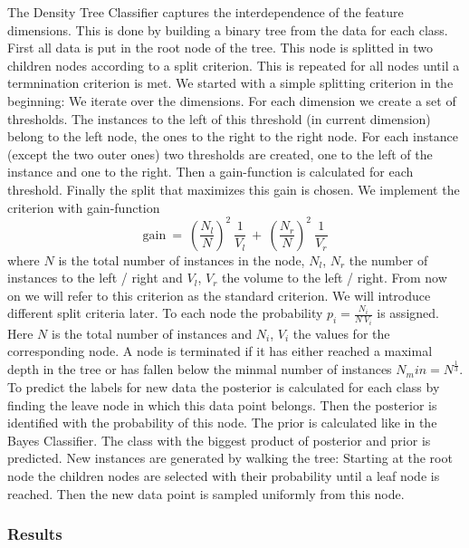 \documentclass{article}
\begin{document}
The Density Tree Classifier captures the interdependence of the feature dimensions. This is done by 
building a binary tree from the data for each class.
First all data is put in the root node of the tree. This node is splitted in two children nodes according to a split criterion.
This is repeated for all nodes until a termnination criterion is met.
\newline
We started with a simple splitting criterion in the beginning:
We iterate over the dimensions. For each dimension we create a set of thresholds. 
The instances to the left of this threshold (in current dimension) belong to the left node, the ones to 
the right to the right node. For each instance (except the two outer ones) two thresholds are created, one to the left
of the instance and one to the right.
Then a gain-function is calculated for each threshold. Finally the split that maximizes this gain is chosen.
We implement the criterion with gain-function
\begin{equation}
	\mathrm{gain} ~ = ~ ( \frac{N_l}{N} )^2 ~ \frac{1}{V_l} ~ +  ~ ( \frac{N_r}{N} )^2 ~ \frac{1}{V_r} 
\end{equation}
where $N$ is the total number of instances in the node, $N_l$, $N_r$ the number of instances to the left / right
and $V_l$, $V_r$ the volume to the left / right.
From now on we will refer to this criterion as the standard criterion. We will introduce different split 
criteria later.
\newline
To each node the probability $p_i = \frac{N_i}{N ~ V_i}$ is assigned. Here $N$ is the total number of instances
and $N_i$, $V_i$ the values for the corresponding node.
\newline
A node is terminated if it has either reached a maximal depth in the tree or has fallen below the minmal number
of instances $N_min = N^{\frac{1}{3}}$.
\newline
To predict the labels for new data the posterior is calculated for each class by finding the leave node in which this data point
belongs. Then the posterior is identified with the probability of this node. The prior is calculated like in the
Bayes Classifier. The class with the biggest product of posterior and prior is predicted.
\newline
New instances are generated by walking the tree: Starting at the root node the children nodes are selected with their
probability until a leaf node is reached. Then the new data point is sampled uniformly from this node.

\subsubsection{Results}
\end{document}
